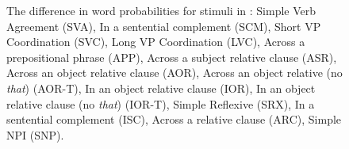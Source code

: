 \documentclass[letterpaper, 12pt]{report}
\begin{document}
\begin{figure}[h]
    \centering
    \caption{The difference in word probabilities for stimuli in \citet{marvin-linzen-2018-targeted}: Simple Verb Agreement (SVA), In a sentential complement (SCM), Short VP Coordination (SVC), Long VP Coordination (LVC), Across a prepositional phrase (APP), Across a subject relative clause (ASR), Across an object relative clause (AOR), Across an object relative (no \textit{that}) (AOR-T),
    In an object relative clause (IOR),
    In an object relative clause (no \textit{that}) (IOR-T),
    Simple Reflexive (SRX), In a sentential complement (ISC),
    Across a relative clause (ARC), Simple NPI (SNP). }
    \label{fig:mlm_marv_diff}
\end{figure}
\end{document}

